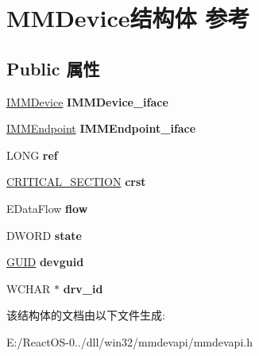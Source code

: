 \hypertarget{struct_m_m_device}{}\section{M\+M\+Device结构体 参考}
\label{struct_m_m_device}
\subsection*{Public 属性}
\begin{DoxyCompactItemize}
\item 
\mbox{\label{struct_m_m_device_a9b0ae906d76dabf08b3ec22a179e1edf}} 
\hyperlink{interface_i_m_m_device}{I\+M\+M\+Device} {\bfseries I\+M\+M\+Device\+\_\+iface}
\item 
\mbox{\label{struct_m_m_device_aa37a5467ea3d728c5b55f625766a9030}} 
\hyperlink{interface_i_m_m_endpoint}{I\+M\+M\+Endpoint} {\bfseries I\+M\+M\+Endpoint\+\_\+iface}
\item 
\mbox{\label{struct_m_m_device_a51f04665a9a04efec7d2dc897bf80e85}} 
L\+O\+NG {\bfseries ref}
\item 
\mbox{\label{struct_m_m_device_a823dddbf8efbd4577eceba3c579f54bf}} 
\hyperlink{struct___c_r_i_t_i_c_a_l___s_e_c_t_i_o_n}{C\+R\+I\+T\+I\+C\+A\+L\+\_\+\+S\+E\+C\+T\+I\+ON} {\bfseries crst}
\item 
\mbox{\label{struct_m_m_device_a9bb68186029f988bba50f147091cc51b}} 
E\+Data\+Flow {\bfseries flow}
\item 
\mbox{\label{struct_m_m_device_a8bb29d13ef315ed262f3768f9ad1fe03}} 
D\+W\+O\+RD {\bfseries state}
\item 
\mbox{\label{struct_m_m_device_af3561f45abfc73814cbde6a4c6388b83}} 
\hyperlink{interface_g_u_i_d}{G\+U\+ID} {\bfseries devguid}
\item 
\mbox{\label{struct_m_m_device_a26115fc598f7272102419d9c5676be63}} 
W\+C\+H\+AR $\ast$ {\bfseries drv\+\_\+id}
\end{DoxyCompactItemize}


该结构体的文档由以下文件生成\+:\begin{DoxyCompactItemize}
\item 
E\+:/\+React\+O\+S-\/0../dll/win32/mmdevapi/mmdevapi.\+h\end{DoxyCompactItemize}
